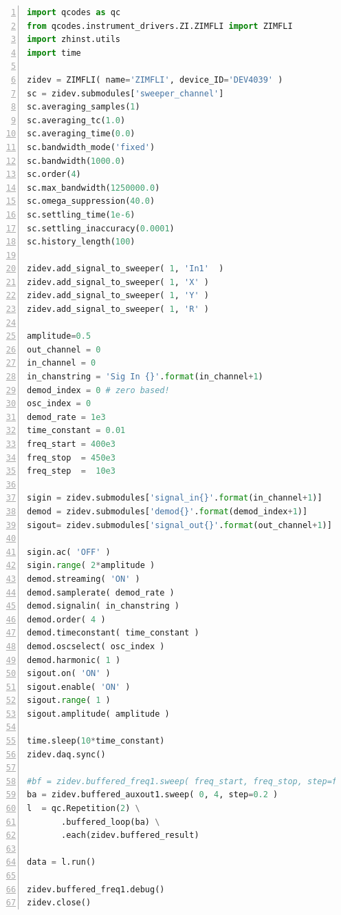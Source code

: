 \documentclass[11pt]{article} %
\begin{document}
\begin{lstlisting}[frame=single, language=Python, numbers=left, xleftmargin=1cm]
import qcodes as qc
from qcodes.instrument_drivers.ZI.ZIMFLI import ZIMFLI
import zhinst.utils
import time

zidev = ZIMFLI( name='ZIMFLI', device_ID='DEV4039' )
sc = zidev.submodules['sweeper_channel']
sc.averaging_samples(1)
sc.averaging_tc(1.0)
sc.averaging_time(0.0)
sc.bandwidth_mode('fixed')
sc.bandwidth(1000.0)
sc.order(4)
sc.max_bandwidth(1250000.0)
sc.omega_suppression(40.0)
sc.settling_time(1e-6)
sc.settling_inaccuracy(0.0001)
sc.history_length(100)

zidev.add_signal_to_sweeper( 1, 'In1'  )
zidev.add_signal_to_sweeper( 1, 'X' )
zidev.add_signal_to_sweeper( 1, 'Y' )
zidev.add_signal_to_sweeper( 1, 'R' )

amplitude=0.5
out_channel = 0
in_channel = 0
in_chanstring = 'Sig In {}'.format(in_channel+1)
demod_index = 0 # zero based!
osc_index = 0
demod_rate = 1e3
time_constant = 0.01
freq_start = 400e3
freq_stop  = 450e3
freq_step  =  10e3

sigin = zidev.submodules['signal_in{}'.format(in_channel+1)]
demod = zidev.submodules['demod{}'.format(demod_index+1)]
sigout= zidev.submodules['signal_out{}'.format(out_channel+1)]

sigin.ac( 'OFF' )
sigin.range( 2*amplitude )
demod.streaming( 'ON' )
demod.samplerate( demod_rate )
demod.signalin( in_chanstring )
demod.order( 4 )
demod.timeconstant( time_constant )
demod.oscselect( osc_index )
demod.harmonic( 1 )
sigout.on( 'ON' )
sigout.enable( 'ON' )
sigout.range( 1 )
sigout.amplitude( amplitude )

time.sleep(10*time_constant)
zidev.daq.sync()

#bf = zidev.buffered_freq1.sweep( freq_start, freq_stop, step=freq_step )
ba = zidev.buffered_auxout1.sweep( 0, 4, step=0.2 )
l  = qc.Repetition(2) \
       .buffered_loop(ba) \
       .each(zidev.buffered_result)

data = l.run()

zidev.buffered_freq1.debug()
zidev.close()
\end{lstlisting}
\end{document}
